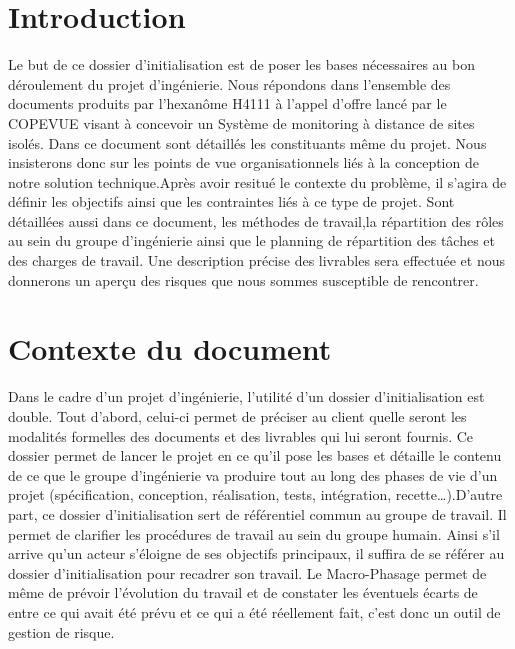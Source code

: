 
\setlength{\parindent}{1cm}

    \maketitle
    \tableofcontents
    

\chapter{Introduction}
Le but de ce dossier d'initialisation est de poser les bases nécessaires au bon déroulement du projet d'ingénierie. Nous répondons dans l'ensemble des documents produits par l'hexanôme H4111 à l'appel d'offre lancé par le COPEVUE visant à concevoir un Système de monitoring à distance de sites isolés. Dans ce document sont détaillés les constituants même du projet. Nous insisterons donc sur les points de vue organisationnels liés à la conception de notre solution technique.Après avoir resitué le contexte du problème, il s'agira de définir les objectifs ainsi que les contraintes liés à ce type de projet. Sont détaillées aussi dans ce document, les méthodes de travail,la répartition des rôles au sein du groupe d'ingénierie ainsi que le planning de répartition des tâches et des charges de travail. Une description précise des livrables sera effectuée et nous donnerons un aperçu des risques que nous sommes susceptible de rencontrer.

    \chapter{Contexte du document}
Dans le cadre d'un projet d'ingénierie, l'utilité d'un dossier d'initialisation est double. Tout d'abord, celui-ci permet de préciser au client quelle seront les modalités formelles des documents et des livrables qui lui seront fournis. Ce dossier permet de lancer le projet en ce qu'il pose les bases et détaille le contenu de ce que le groupe d'ingénierie va produire tout au long des phases de vie d'un projet (spécification, conception, réalisation, tests, intégration, recette…).D'autre part, ce dossier d'initialisation sert de référentiel commun au groupe de travail. Il permet de clarifier les procédures de travail au sein du groupe humain. Ainsi s'il arrive qu'un acteur s'éloigne de ses objectifs principaux, il suffira de se référer au dossier d'initialisation pour recadrer son travail. Le Macro-Phasage permet de même de prévoir l'évolution du travail et de constater les éventuels écarts de entre ce qui avait été prévu et ce qui a été réellement fait, c'est donc un outil de gestion de risque.
